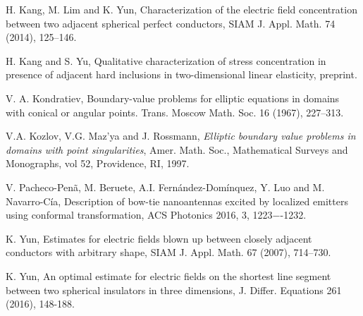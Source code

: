 \documentclass[11pt,a4paper]{article}
\numberwithin{equation}{section}
\begin{document}
\begin{thebibliography}{99}
 H. Kang, M. Lim and K. Yun, Characterization of the electric field concentration between two adjacent spherical perfect conductors, SIAM J. Appl. Math. 74 (2014), 125--146.

 H. Kang and S. Yu, Qualitative characterization of stress concentration in presence of adjacent hard inclusions in two-dimensional linear elasticity, preprint.

 V. A. Kondratiev, Boundary-value problems for elliptic equations in
domains with conical or angular points. Trans. Moscow Math. Soc. 16 (1967), 227--313.

 V.A. Kozlov, V.G. Maz'ya and J. Rossmann, {\sl Elliptic boundary
value problems in domains with point singularities}, Amer. Math. Soc., Mathematical Surveys and Monographs, vol 52, Providence, RI, 1997.

 V. Pacheco-Pen\~{a}, M. Beruete, A.I. Fern\'{a}ndez-Dom\'{i}nquez, Y. Luo and M. Navarro-C\'{i}a, Description of bow-tie nanoantennas excited by localized emitters using conformal transformation, ACS Photonics 2016, 3, 1223−-1232.

 {K. Yun,} Estimates for electric fields blown up between closely adjacent conductors with arbitrary shape, {SIAM J. Appl. Math.} { 67}  (2007), 714--730.

 K. Yun, An optimal estimate for electric fields on the shortest line segment between two spherical insulators in three dimensions, J. Differ. Equations 261 (2016), 148-188.

\end{thebibliography}
\end{document}
